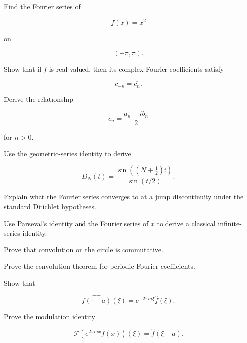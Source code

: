\begin{exercise}[2]
Find the Fourier series of

\[
f(x)=x^2
\]

on

\[
(-\pi,\pi).
\]
\end{exercise}

\begin{exercise}[2]
Show that if \(f\) is real-valued, then its complex Fourier coefficients
satisfy

\[
c_{-n}=\overline{c_n}.
\]
\end{exercise}

\begin{exercise}[2]
Derive the relationship

\[
c_n=\frac{a_n-ib_n}{2}
\]

for \(n>0\).
\end{exercise}

\begin{exercise}[2]
Use the geometric-series identity to derive

\[
D_N(t)
=
\frac{
\sin\left((N+\frac12)t\right)
}{
\sin(t/2)
}.
\]
\end{exercise}

\begin{exercise}[2]
Explain what the Fourier series converges to at a jump discontinuity under
the standard Dirichlet hypotheses.
\end{exercise}

\begin{exercise}[2]
Use Parseval's identity and the Fourier series of \(x\) to derive a
classical infinite-series identity.
\end{exercise}

\begin{exercise}[3]
Prove that convolution on the circle is commutative.
\end{exercise}

\begin{exercise}[3]
Prove the convolution theorem for periodic Fourier coefficients.
\end{exercise}

\begin{exercise}[3]
Show that

\[
\widehat{f(\cdot-a)}(\xi)
=
e^{-2\pi ia\xi}\widehat{f}(\xi).
\]
\end{exercise}

\begin{exercise}[3]
Prove the modulation identity

\[
\mathcal{F}
\left(
e^{2\pi iax}f(x)
\right)(\xi)
=
\widehat{f}(\xi-a).
\]
\end{exercise}

